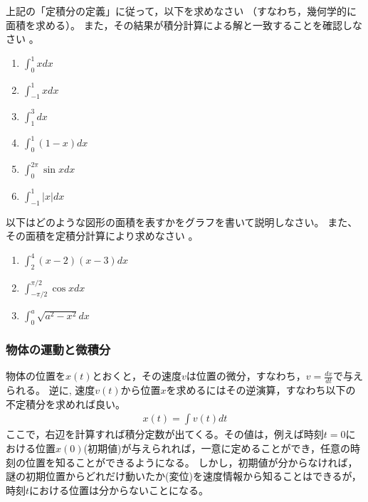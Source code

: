 \documentclass[twocolumn,11pt]{jarticle}
\begin{document}
\nexercise
上記の「定積分の定義」に従って，以下を求めなさい
（すなわち，幾何学的に面積を求める）。
また，その結果が積分計算による解と一致することを確認しなさい
。
\begin{enumerate}
\item\label{iitem:int_0^1xdx} $\displaystyle\int_0^1xdx$
\item\label{iitem:int_-1^1xdx} $\displaystyle\int_{-1}^1xdx$
\item\label{iitem:int_1^3dx} $\displaystyle\int_1^3dx$
\item\label{iitem:int_0^1(1-x)dx} $\displaystyle\int_0^1(1-x)dx$
\item\label{iitem:int_0^2pisinxdx} $\displaystyle\int_0^{2\pi} \sin x dx$
\item\label{iitem:int_-1^1|x|dx} $\displaystyle\int_{-1}^1|x|dx$
\end{enumerate}

\nexercise
以下はどのような図形の面積を表すかをグラフを書いて説明しなさい。
また、その面積を定積分計算により求めなさい
。
\begin{enumerate}
\item\label{iitem:int_2^4(x-2)(x-3)dx} $\displaystyle\int_2^4(x-2)(x-3) dx$
\item\label{iitem:int_(-pi/2)^(pi/2)cos xdx}
  $\displaystyle\int_{-\pi/2}^{\pi/2}\cos x dx$
\item\label{iitem:int_0^asqrt(a^2-x^2)dx} $\displaystyle\int_0^a \sqrt{a^2-x^2}dx$
\end{enumerate}

\subsubsection{物体の運動と微積分}
物体の位置を$x(t)$とおくと，その速度$v$は位置の微分，すなわち，$v=\frac{dx}{dt}$で与えられる。
逆に, 速度$v(t)$から位置$x$を求めるにはその逆演算，すなわち以下の不定積分を求めれば良い。
\begin{align*}
x(t)=\int v(t)dt
\end{align*}
ここで，右辺を計算すれば積分定数が出てくる。その値は，例えば時刻$t=0$における位置$x(0)$(初期値)が与えられれば，一意に定めることができ，任意の時刻の位置を知ることができるようになる。
しかし，初期値が分からなければ，謎の初期位置からどれだけ動いたか(変位)を速度情報から知ることはできるが，時刻$t$における位置は分からないことになる。
\end{document}
